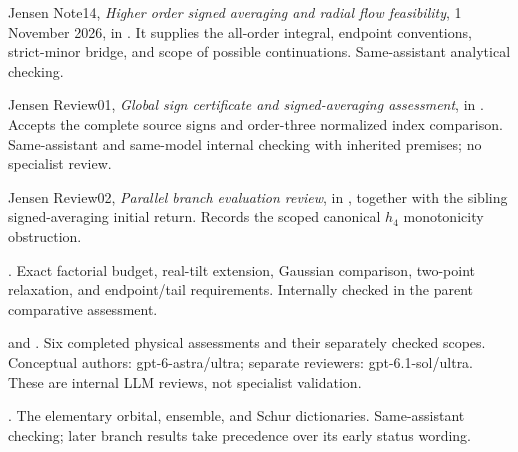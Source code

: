 \documentclass[11pt,letterpaper]{article}
\numberwithin{equation}{section}
\theoremstyle{remark}
\newcommand{\evid}[1]{\textsf{[#1]}}
\begin{document}
\begin{description}[style=nextline,leftmargin=2.5em]
\item[\evid{J1}] Jensen Note14, \emph{Higher order signed averaging and radial
flow feasibility}, 1 November 2026, in . It supplies the
all-order integral, endpoint conventions, strict-minor bridge, and
scope of possible continuations. Same-assistant analytical checking.
\item[\evid{J2}] Jensen Review01, \emph{Global sign certificate and
signed-averaging assessment}, in . Accepts the complete
source signs and order-three normalized index comparison. Same-assistant
and same-model internal checking with inherited premises; no specialist review.
\item[\evid{J3}] Jensen Review02, \emph{Parallel branch evaluation review},
in , together with the sibling signed-averaging
initial return. Records the scoped canonical $h_4$ monotonicity obstruction.
\item[\evid{M1}] .
Exact factorial budget, real-tilt extension, Gaussian comparison,
two-point relaxation, and endpoint/tail requirements. Internally checked
in the parent comparative assessment.
\item[\evid{M2}] 
and .
Six completed physical assessments and their separately checked scopes.
Conceptual authors: gpt-6-astra/ultra; separate reviewers:
gpt-6.1-sol/ultra. These are internal LLM reviews, not specialist validation.
\item[\evid{M3}] .
The elementary orbital, ensemble, and Schur dictionaries. Same-assistant
checking; later branch results take precedence over its early status wording.
\end{description}
\end{document}
